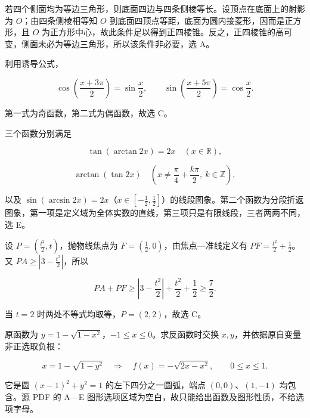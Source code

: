 \begin{answer}

若四个侧面均为等边三角形，则底面四边与四条侧棱等长。设顶点在底面上的射影为 $O$；由四条侧棱相等知 $O$ 到底面四顶点等距，底面为圆内接菱形，因而是正方形，且 $O$ 为正方形中心，故此条件足以得到正四棱锥。反之，正四棱锥的高可变，侧面未必为等边三角形，所以该条件非必要，选 A。


利用诱导公式，

\nopagebreak[4]
\[
\cos\left(\frac{x+3\pi}{2}\right)=\sin\frac x2,
\qquad
\sin\left(\frac{x+5\pi}{2}\right)=\cos\frac x2.
\]

第一式为奇函数，第二式为偶函数，故选 C。


三个函数分别满足

\nopagebreak[4]
\[
\tan(\arctan 2x)=2x\quad(x\in\mathbb R),
\]

\nopagebreak[4]
\[
\arctan(\tan 2x)\quad\left(x\ne\frac\pi4+\frac{k\pi}{2},\ k\in\mathbb Z\right),
\]

以及 $\sin(\arcsin 2x)=2x$（$x\in[-\frac12,\frac12]$）的线段图象。第二个函数为分段折返图象，第一项是定义域为全体实数的直线，第三项只是有限线段，三者两两不同，选 E。


设 $P=(\frac{t^2}{2},t)$，抛物线焦点为 $F=(\frac12,0)$，由焦点—准线定义有 $PF=\frac{t^2}{2}+\frac12$。又 $PA\ge\left|3-\frac{t^2}{2}\right|$，所以

\nopagebreak[4]
\[
PA+PF\ge\left|3-\frac{t^2}{2}\right|+\frac{t^2}{2}+\frac12\ge\frac72.
\]

当 $t=2$ 时两处不等式均取等，$P=(2,2)$，故选 C。


原函数为 $y=1-\sqrt{1-x^2}$，$-1\le x\le0$。求反函数时交换 $x,y$，并依据原自变量非正选取负根：

\nopagebreak[4]
\[
x=1-\sqrt{1-y^2}
\quad\Longrightarrow\quad
f(x)=-\sqrt{2x-x^2},\qquad 0\le x\le1.
\]

它是圆 $(x-1)^2+y^2=1$ 的左下四分之一圆弧，端点 $(0,0)$、$(1,-1)$ 均包含。源 PDF 的 A—E 图形选项区域为空白，故只能给出函数及图形性质，不给选项字母。





\end{answer}
